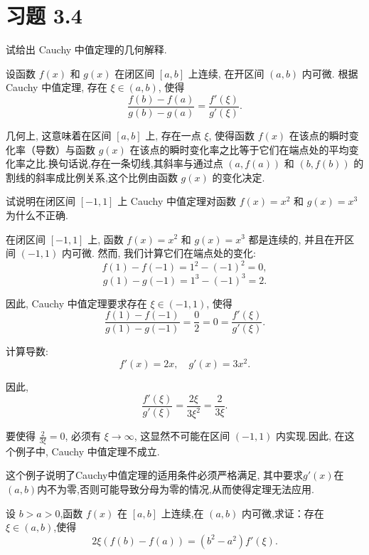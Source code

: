 \section{习题 3.4}

\begin{exercise}[3.4.1]
    试给出 Cauchy 中值定理的几何解释.
\end{exercise}

\begin{solution}
    设函数 $f(x)$ 和 $g(x)$ 在闭区间 $[a, b]$ 上连续, 在开区间 $(a, b)$ 内可微. 根据 Cauchy 中值定理, 存在 $\xi \in (a, b)$, 使得
    $$\frac{f(b) - f(a)}{g(b) - g(a)} = \frac{f'(\xi)}{g'(\xi)}.$$

    几何上, 这意味着在区间 $[a, b]$ 上, 存在一点 $\xi$, 使得函数 $f(x)$ 在该点的瞬时变化率（导数）与函数 $g(x)$ 在该点的瞬时变化率之比等于它们在端点处的平均变化率之比.换句话说,存在一条切线,其斜率与通过点 $(a, f(a))$ 和 $(b, f(b))$ 的割线的斜率成比例关系,这个比例由函数 $g(x)$ 的变化决定.
\end{solution}

\begin{exercise}[3.4.2]
    试说明在闭区间 $[-1, 1]$ 上 Cauchy 中值定理对函数 $f(x) = x^2$ 和 $g(x) = x^3$ 为什么不正确.
\end{exercise}

\begin{solution}
    在闭区间 $[-1, 1]$ 上, 函数 $f(x) = x^2$ 和 $g(x) = x^3$ 都是连续的, 并且在开区间 $(-1, 1)$ 内可微. 然而, 我们计算它们在端点处的变化:
    $$f(1) - f(-1) = 1^2 - (-1)^2 = 0,$$
    $$g(1) - g(-1) = 1^3 - (-1)^3 = 2.$$

    因此, Cauchy 中值定理要求存在 $\xi \in (-1, 1)$, 使得
    $$\frac{f(1) - f(-1)}{g(1) - g(-1)} = \frac{0}{2} = 0 = \frac{f'(\xi)}{g'(\xi)}.$$

    计算导数:
    $$f'(x) = 2x, \quad g'(x) = 3x^2.$$

    因此,
    $$\frac{f'(\xi)}{g'(\xi)} = \frac{2\xi}{3\xi^2} = \frac{2}{3\xi}.$$

    要使得 $\frac{2}{3\xi} = 0$, 必须有 $\xi \to \infty$, 这显然不可能在区间 $(-1, 1)$ 内实现.因此, 在这个例子中, Cauchy 中值定理不成立.

    这个例子说明了Cauchy中值定理的适用条件必须严格满足, 其中要求$g'(x)$在$(a, b)$内不为零,否则可能导致分母为零的情况,从而使得定理无法应用.
\end{solution}

\begin{exercise}[3.4.3]
    设 $b > a > 0$,函数 $f(x)$ 在 $[a, b]$ 上连续,在 $(a, b)$ 内可微,求证：存在 $\xi \in (a, b)$,使得
    $$2\xi (f(b) - f(a)) = (b^2 - a^2) f'(\xi).$$
\end{exercise}

